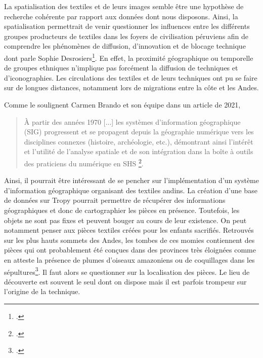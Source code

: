 \documentclass[a4paper, twoside, 12pt]{book}
\begin{document}
La spatialisation des textiles et de leurs images semble être une hypothèse de recherche cohérente par rapport aux données dont nous disposons. Ainsi, la spatialisation permettrait de venir questionner les influences entre les différents groupes producteurs de textiles dans les foyers de civilisation péruviens afin de comprendre les \og phénomènes de diffusion, d'innovation et de blocage technique \fg \:dont parle Sophie Desrosiers\footcite[p.~264]{desrosiersTechniquesTissageOntelles2010}. En effet, la proximité géographique ou temporelle de groupes ethniques n'implique pas forcément la diffusion de techniques et d'iconographies. Les circulations des textiles et de leurs techniques ont pu se faire sur de longues distances, notamment lors de migrations entre la côte et les Andes.

\noindent Comme le soulignent Carmen Brando et son équipe dans un article de 2021, 

\begin{quote}
    \og  À partir des années 1970 [...] les systèmes d'information géographique (SIG) progressent et se propagent depuis la géographie numérique vers les disciplines connexes (histoire, archéologie, etc.), démontrant ainsi l'intérêt et l'utilité de l'analyse spatiale et de son intégration dans la \og boîte à outils \fg \:des praticiens du numérique en SHS \fg \footcite[p.~3]{brandoIntroductionHumanitesNumeriques2021}. 
\end{quote} 

\noindent Ainsi, il pourrait être intéressant de se pencher sur l'implémentation d'un système d'information géographique organisant des textiles andins. La création d'une base de données sur Tropy pourrait permettre de récupérer des informations géographiques et donc de cartographier les pièces en présence. Toutefois, les objets ne sont pas fixes et peuvent bouger au cours de leur existence. On peut notamment penser aux pièces textiles créées pour les enfants sacrifiés. Retrouvés sur les plus hauts sommets des Andes, les tombes de ces momies contiennent des pièces qui ont probablement été conçues dans des provinces très éloignées comme en atteste la présence de plumes d'oiseaux amazoniens ou de coquillages dans les sépultures\footcite{abalderussoArteTextilIncaico2010}. Il faut alors se questionner sur la localisation des pièces. Le lieu de découverte est souvent le seul dont on dispose mais il est parfois trompeur sur l'origine de la technique. \\
\end{document}
